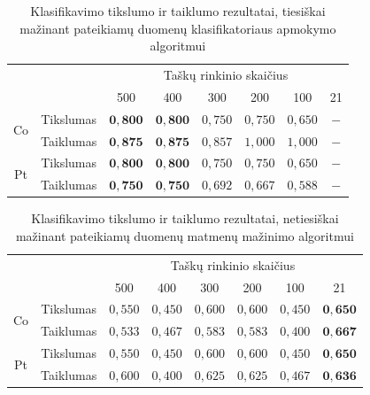 \documentclass[]{vgtuef}
\begin{document}
\begin{table}
	\centering
	\caption{Klasifikavimo tikslumo ir taiklumo rezultatai, tiesiškai mažinant pateikiamų duomenų klasifikatoriaus apmokymo algoritmui}
	\label{table:second_phase_experiment}
	\begin{tabular}{|c|c|c|c|c|c|c|c|} \hline
			& & \multicolumn{6}{c|}{Taškų rinkinio skaičius} \\ \cline{3-8}
						&	& 500 	& 400	& 300 	& 200 & 100 	& 21 	\\ \hline
		\multirow{2}{*}{Co}
		& Tikslumas	& $\mathbf{0,800}$ & $\mathbf{0,800}$ & $0,750$ & $0,750$ & $0,650$ & $-$ \\ \cline{2-8}
		& Taiklumas  &	$\mathbf{0,875}$ & $\mathbf{0,875}$ & $0,857$ & $1,000$ & $1,000$ & $-$ \\ \hline
		\multirow{2}{*}{Pt}
		& Tikslumas	& $\mathbf{0,800}$ & $\mathbf{0,800}$ & $0,750$ & $0,750$ & $0,650$ & $-$ \\ \cline{2-8}
		& Taiklumas  &	$\mathbf{0,750}$ & $\mathbf{0,750}$ & $0,692$ & $0,667$ & $0,588$ & $-$ \\ \hline
	\end{tabular}
\end{table}


\begin{table}
	\centering
	\caption{Klasifikavimo tikslumo ir taiklumo rezultatai, netiesiškai mažinant pateikiamų duomenų matmenų mažinimo algoritmui}
	\label{table:second_phase_not_linear_experiment}
	\begin{tabular}{|c|c|c|c|c|c|c|c|} \hline
			& & \multicolumn{6}{c|}{Taškų rinkinio skaičius} \\ \cline{3-8}
						&	& 500 	& 400	& 300 	& 200 & 100 	& 21 	\\ \hline
		\multirow{2}{*}{Co}
		& Tikslumas & $0,550$ & $0,450$ & $0,600$ & $0,600$ & $0,450$ & $\mathbf{0,650}$ \\ \cline{2-8}
		& Taiklumas & $0,533$ & $0,467$ & $0,583$ & $0,583$ & $0,400$ & $\mathbf{0,667}$ \\ \hline
		\multirow{2}{*}{Pt}
		& Tikslumas & $0,550$ & $0,450$ & $0,600$ & $0,600$ & $0,450$ & $\mathbf{0,650}$ \\ \cline{2-8}
		& Taiklumas & $0,600$ & $0,400$ & $0,625$ & $0,625$ & $0,467$ & $\mathbf{0,636}$ \\ \hline
	\end{tabular}
\end{table}
\end{document}
